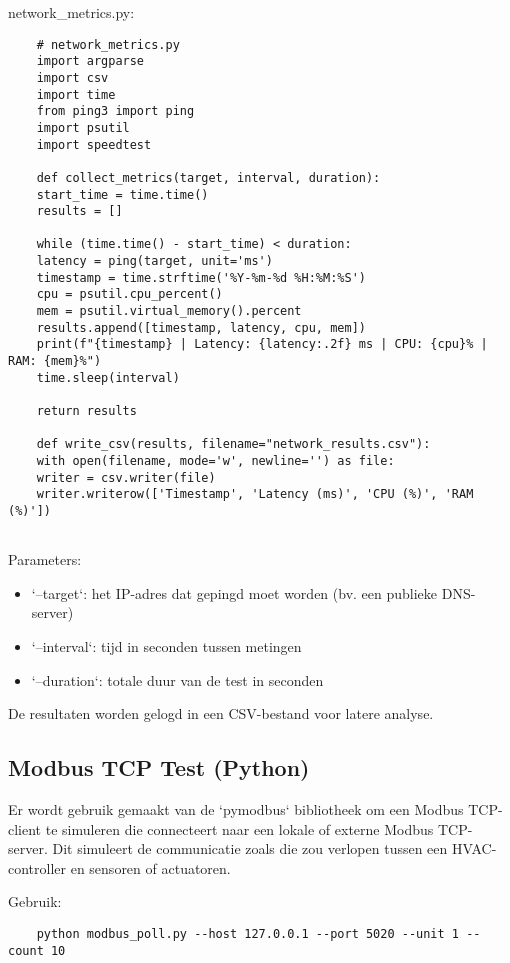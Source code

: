 network\_metrics.py:
\begin{verbatim}
    # network_metrics.py
    import argparse
    import csv
    import time
    from ping3 import ping
    import psutil
    import speedtest
    
    def collect_metrics(target, interval, duration):
    start_time = time.time()
    results = []
    
    while (time.time() - start_time) < duration:
    latency = ping(target, unit='ms')
    timestamp = time.strftime('%Y-%m-%d %H:%M:%S')
    cpu = psutil.cpu_percent()
    mem = psutil.virtual_memory().percent
    results.append([timestamp, latency, cpu, mem])
    print(f"{timestamp} | Latency: {latency:.2f} ms | CPU: {cpu}% | RAM: {mem}%")
    time.sleep(interval)
    
    return results
    
    def write_csv(results, filename="network_results.csv"):
    with open(filename, mode='w', newline='') as file:
    writer = csv.writer(file)
    writer.writerow(['Timestamp', 'Latency (ms)', 'CPU (%)', 'RAM (%)'])
    
\end{verbatim}

Parameters:
\begin{itemize}
    \item `--target`: het IP-adres dat gepingd moet worden (bv. een publieke DNS-server)
    \item `--interval`: tijd in seconden tussen metingen
    \item `--duration`: totale duur van de test in seconden
\end{itemize}

De resultaten worden gelogd in een CSV-bestand voor latere analyse.

\subsection{Modbus TCP Test (Python)}

Er wordt gebruik gemaakt van de `pymodbus` bibliotheek om een Modbus TCP-client te simuleren die connecteert naar een lokale of externe Modbus TCP-server. Dit simuleert de communicatie zoals die zou verlopen tussen een HVAC-controller en sensoren of actuatoren.

Gebruik:
\begin{verbatim}
    python modbus_poll.py --host 127.0.0.1 --port 5020 --unit 1 --count 10
\end{verbatim}

